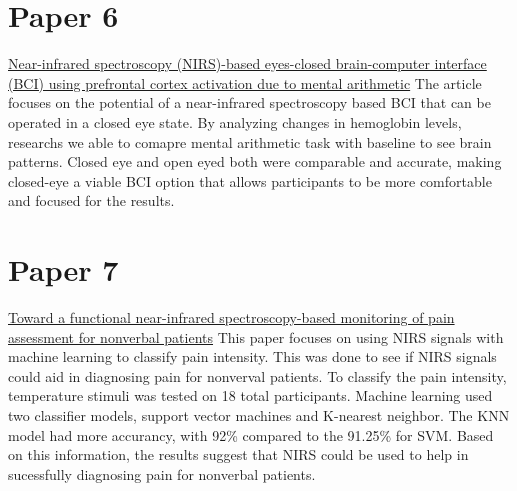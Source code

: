 \documentclass[12pt]{article}
\begin{document}
\section{Paper 6}
\href{https://www.nature.com/articles/srep36203}{Near-infrared spectroscopy (NIRS)-based eyes-closed brain-computer interface (BCI) using prefrontal cortex activation due to mental arithmetic}
The article focuses on the potential of a near-infrared spectroscopy based BCI that can be operated in a closed eye state. By analyzing changes in hemoglobin levels, researchs we able to comapre mental arithmetic task with baseline to see brain patterns. Closed eye and open eyed both were comparable and accurate, making closed-eye a viable BCI option that allows participants to be more comfortable and focused for the results. 

\section{Paper 7}
\href{https://pubmed.ncbi.nlm.nih.gov/29076307/}{Toward a functional near-infrared spectroscopy-based monitoring of pain assessment for nonverbal patients}
This paper focuses on using NIRS signals with machine learning to classify pain intensity. This was done to see if NIRS signals could aid in diagnosing pain for nonverval patients. To classify the pain intensity, temperature stimuli was tested on 18 total participants. Machine learning used two classifier models, support vector machines and K-nearest neighbor. The KNN model had more accurancy, with 92\% compared to the 91.25\% for SVM. Based on this information, the results suggest that NIRS could be used to help in sucessfully diagnosing pain for nonverbal patients.
\end{document}
